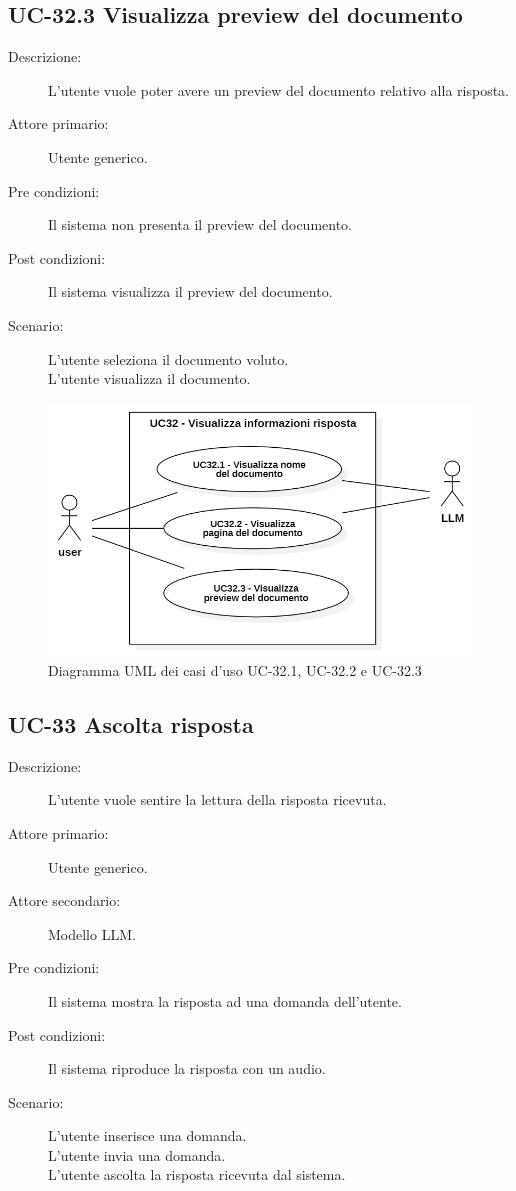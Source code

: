 \subsection{UC-32.3 Visualizza preview del documento}
\begin{description}
    \item[Descrizione:] L'utente vuole poter avere un preview del documento relativo alla risposta.
    \item[Attore primario:] Utente generico.
    \item[Pre condizioni:] Il sistema non presenta il preview del documento.
    \item[Post condizioni:] Il sistema visualizza il preview del documento.
    \item[Scenario:] L'utente seleziona il documento voluto. \\L'utente visualizza il documento.
\end{description}

\begin{figure}[H]
    \centering
    \includegraphics[width=0.9\linewidth]{UC32.1-2-3.PNG}
    \caption{Diagramma UML dei casi d'uso UC-32.1, UC-32.2 e UC-32.3}
    \label{fig:UC32.1-2-3}
\end{figure}

\subsection{UC-33 Ascolta risposta}
\begin{description}
    \item[Descrizione:] L'utente vuole sentire la lettura della risposta ricevuta.
    \item[Attore primario:] Utente generico.
    \item[Attore secondario:] Modello LLM.
    \item[Pre condizioni:] Il sistema mostra la risposta ad una domanda dell'utente.
    \item[Post condizioni:] Il sistema riproduce la risposta con un audio.
    \item[Scenario:] L'utente inserisce una domanda.\\L'utente invia una domanda.\\L'utente ascolta la risposta ricevuta dal sistema.
\end{description}

